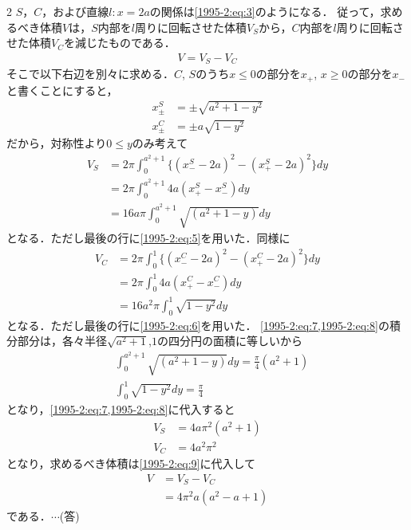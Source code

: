 \documentclass[../../main.tex]{subfiles}
\begin{document}
\begin{multicols}{2}
  $S$，$C$，および直線$l:x=2a$の関係は\cref{1995-2:eq:3}のようになる．
  従って，求めるべき体積$V$は，$S$内部を$l$周りに回転させた体積$V_S$から，$C$内部を$l$周りに回転させた体積$V_C$を減じたものである．
  \begin{align}
    V = V_S - V_C\label{1995-2:eq:9}
  \end{align}
  そこで以下右辺を別々に求める．$C$, $S$のうち$x\le 0$の部分を$x_{+}$, $x\ge 0$の部分を$x_{-}$と書くことにすると，
  \begin{align}
    x^{S}_{\pm} & = \pm \sqrt{a^2+1-y^2} \label{1995-2:eq:5} \\
    x^{C}_{\pm} & = \pm a\sqrt{1-y^2} \label{1995-2:eq:6}
  \end{align}
  だから，対称性より$0\le y$のみ考えて
  \begin{align}
    V_S
     & = 2\pi \int_{0}^{a^2+1} \{(x^{S}_{-} - 2a)^2 - (x^{S}_{+} - 2a)^2\} dy \nonumber \\
     & = 2\pi \int_{0}^{a^2+1} 4a(x^{S}_{+} - x^{S}_{-}) dy \nonumber                   \\
     & = 16a\pi \int_{0}^{a^2+1} \sqrt{(a^2+1-y)} dy \label{1995-2:eq:7}
  \end{align}
  となる．ただし最後の行に\cref{1995-2:eq:5}を用いた．同様に
  \begin{align}
    V_C
     & = 2\pi \int_{0}^{1} \{(x^{C}_{-} - 2a)^2 - (x^{C}_{+} - 2a)^2\} dy \nonumber \\
     & = 2\pi \int_{0}^{1} 4a(x^{C}_{+} - x^{C}_{-}) dy \nonumber                   \\
     & = 16a^2\pi \int_{0}^{1} \sqrt{1-y^2} dy \label{1995-2:eq:8}
  \end{align}
  となる．ただし最後の行に\cref{1995-2:eq:6}を用いた．
  \cref{1995-2:eq:7,1995-2:eq:8}の積分部分は，各々半径$\sqrt{a^2+1}$,$1$の四分円の面積に等しいから
  \begin{align}
     & \int_{0}^{a^2+1} \sqrt{(a^2+1-y)} dy = \frac{\pi}{4}(a^2+1) \\
     & \int_{0}^{1} \sqrt{1-y^2} dy = \frac{\pi}{4}
  \end{align}
  となり，\cref{1995-2:eq:7,1995-2:eq:8}に代入すると
  \begin{align}
    V_S & = 4a\pi^2 (a^2+1) \\
    V_C & = 4a^2\pi^2
  \end{align}
  となり，求めるべき体積は\cref{1995-2:eq:9}に代入して
  \begin{align}
    V
     & = V_S - V_C         \\
     & = 4\pi^2a (a^2-a+1)
  \end{align}
  である．$\cdots$(答)



\end{multicols}
\end{document}
